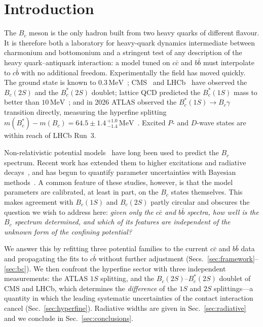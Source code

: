 \documentclass[10pt,twocolumn]{article}
\newcommand{\Bc}{B_c}
\newcommand{\Bcs}{B_c^*}
\newcommand{\cc}{c\bar c}
\newcommand{\bb}{b\bar b}
\newcommand{\cb}{c\bar b}
\newcommand{\MeV}{\,\mathrm{MeV}}
\begin{document}
\section{Introduction}
\label{sec:intro}

The $\Bc$ meson is the only hadron built from two heavy quarks of different flavour.
It is therefore both a laboratory for heavy-quark dynamics intermediate between charmonium and bottomonium and a stringent test of any description of the heavy quark--antiquark interaction: a model tuned on $\cc$ and $\bb$ must interpolate to $\cb$ with no additional freedom.
Experimentally the field has moved quickly.
The ground state is known to $0.3\MeV$~\cite{PDG2026}; CMS~\cite{CMS2019} and LHCb~\cite{LHCb2019} have observed the $\Bc(2S)$ and the $\Bcs(2S)$ doublet; lattice QCD predicted the $\Bcs(1S)$ mass to better than $10\MeV$~\cite{HPQCD2010}; and in 2026 ATLAS observed the $\Bcs(1S)\to\Bc\gamma$ transition directly, measuring the hyperfine splitting $m(\Bcs)-m(\Bc)=64.5\pm1.4\,^{+1.0}_{-1.4}\MeV$~\cite{ATLAS2026}.
Excited $P$- and $D$-wave states are within reach of LHCb Run~3.

Non-relativistic potential models~\cite{Eichten1994,Godfrey2004,Ebert2003} have long been used to predict the $\Bc$ spectrum.
Recent work has extended them to higher excitations and radiative decays~\cite{Mony2026,BcSpectro2026}, and has begun to quantify parameter uncertainties with Bayesian methods~\cite{Mony2026}.
A common feature of these studies, however, is that the model parameters are calibrated, at least in part, on the $\Bc$ states themselves.
This makes agreement with $\Bc(1S)$ and $\Bc(2S)$ partly circular and obscures the question we wish to address here:
\emph{given only the $\cc$ and $\bb$ spectra, how well is the $\Bc$ spectrum determined, and which of its features are independent of the unknown form of the confining potential?}

We answer this by refitting three potential families to the current $\cc$ and $\bb$ data and propagating the fits to $\cb$ without further adjustment (Secs.~\ref{sec:framework}--\ref{sec:bc}).
We then confront the hyperfine sector with three independent measurements: the ATLAS $1S$ splitting, and the $\Bc(2S)$--$\Bcs(2S)$ doublet of CMS and LHCb, which determines the \emph{difference} of the $1S$ and $2S$ splittings---a quantity in which the leading systematic uncertainties of the contact interaction cancel (Sec.~\ref{sec:hyperfine}).
Radiative widths are given in Sec.~\ref{sec:radiative} and we conclude in Sec.~\ref{sec:conclusions}.
\end{document}

